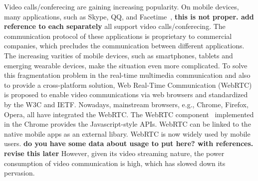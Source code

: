 Video calls/conferecing are gaining increasing popularity.  On mobile
devices, many applications, such as Skype, QQ, and
Facetime~\cite{skype, qq, facetime}, {\bf this is not proper. add
  reference to each separately} all support video
calls/conferecing. The communication protocol of these applications is
proprietary to commercial companies, which precludes the communication
between different applications.  The increasing varities of mobile
devices, such as smartphones, tablets and emerging wearable devices,
make the situation even more complicated. To solve this fragmentation
problem in the real-time multimedia communication and also to provide
a cross-platform solution, Web Real-Time Communication
(WebRTC)~\cite{webrtcstandard} is proposed to enable video
communications via web browsers and standardized by the W3C and
IETF. Nowadays, mainstream browsers, e.g., Chrome, Firefox, Opera, all have integrated the WebRTC. The WebRTC
component~\cite{webrtcproject} implemented in the Chrome provides the
Javascript-style APIs. WebRTC can be linked to the native mobile apps
as an external libary.  WebRTC is now widely used by mobile
users. {\bf do you have some data about usage to put here? with
  references.} {\bf revise this later} However, given its video
streaming nature, the power consumption of video communication is
high, which has slowed down its pervasion.






